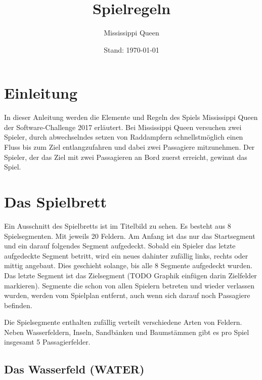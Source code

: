 \documentclass[12pt,a4paper, ngerman, oneside]{scrartcl}
\title{Spielregeln}
\subtitle{Mississippi Queen}
\date{Stand: \today}
\def\Tiles/{8}
\def\FieldsPerTile/{20}
\def\Passagiere/{5}
\begin{document}
\maketitle
\vspace*{\fill}

\newpage
\tableofcontents
\thispagestyle{empty}
\newpage
\setcounter{page}{1}

\section{Einleitung}

In dieser Anleitung werden die Elemente und Regeln des Spiels Mississippi Queen
der Software-Challenge 2017 erläutert. Bei Mississippi Queen versuchen zwei
Spieler, durch abwechselndes setzen von Raddampfern schnellstmöglich einen Fluss
bis zum Ziel entlangzufahren und dabei zwei Passagiere mitzunehmen. Der Spieler,
der das Ziel mit zwei Passagieren an Bord zuerst erreicht, gewinnt das Spiel.


\section{Das Spielbrett}

Ein Ausschnitt des Spielbretts ist im Titelbild zu sehen. Es besteht aus \Tiles/
Spielsegmenten. Mit jeweils \FieldsPerTile/ Feldern. Am Anfang ist das nur das
Startsegment und ein darauf folgendes Segment aufgedeckt. Sobald ein Spieler das
letzte aufgedeckte Segment betritt, wird ein neues dahinter zufällig links,
rechts oder mittig angebaut. Dies geschieht solange, bis alle \Tiles/ Segmente
aufgedeckt wurden. Das letzte Segment ist das Zielsegment (TODO Graphik einfügen
darin Zielfelder markieren). Segmente die schon von allen Spielern betreten und
wieder verlassen wurden, werden vom Spielplan entfernt, auch wenn sich darauf
noch Passagiere befinden.

Die Spielsegmente enthalten zufällig verteilt verschiedene Arten von Feldern.
Neben Wasserfeldern, Inseln, Sandbänken und Baumstämmen gibt es pro Spiel
insgesamt \Passagiere/ Passagierfelder.


\subsection{\label{water}Das Wasserfeld (WATER)}
\end{document}
